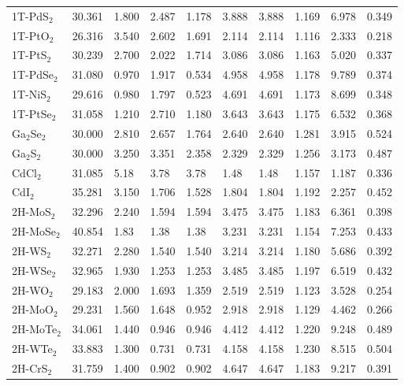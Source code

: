 \begin{center}
\begin{tabularx}{1.1\linewidth}{lXXXXXXXXX}
    1T-PdS$_{2}$ & 30.361  & 1.800  & 2.487  & 1.178  & 3.888  & 3.888  & 1.169  & 6.978  & 0.349 \\
    1T-PtO$_{2}$ & 26.316  & 3.540  & 2.602  & 1.691  & 2.114  & 2.114  & 1.116  & 2.333  & 0.218 \\
    1T-PtS$_{2}$ & 30.239  & 2.700  & 2.022  & 1.714  & 3.086  & 3.086  & 1.163  & 5.020  & 0.337 \\
    1T-PdSe$_{2}$ & 31.080  & 0.970  & 1.917  & 0.534  & 4.958  & 4.958  & 1.178  & 9.789  & 0.374 \\
    1T-NiS$_{2}$ & 29.616  & 0.980  & 1.797  & 0.523  & 4.691  & 4.691  & 1.173  & 8.699  & 0.348 \\
    1T-PtSe$_{2}$ & 31.058  & 1.210  & 2.710  & 1.180  & 3.643  & 3.643  & 1.175  & 6.532  & 0.368 \\
    Ga$_{2}$Se$_{2}$ & 30.000  & 2.810  & 2.657  & 1.764  & 2.640  & 2.640  & 1.281  & 3.915  & 0.524 \\
    Ga$_{2}$S$_{2}$ & 30.000  & 3.250  & 3.351  & 2.358  & 2.329  & 2.329  & 1.256  & 3.173  & 0.487 \\
    CdCl$_{2}$ & 31.085 & 5.18 & 3.78 & 3.78 & 1.48 & 1.48 & 1.157 & 1.187 & 0.336 \\
    CdI$_{2}$ & 35.281  & 3.150  & 1.706  & 1.528  & 1.804  & 1.804  & 1.192  & 2.257  & 0.452 \\
    2H-MoS$_{2}$ & 32.296  & 2.240  & 1.594  & 1.594  & 3.475  & 3.475  & 1.183  & 6.361  & 0.398 \\
    2H-MoSe$_{2}$ & 40.854 & 1.83 & 1.38 &   1.38 & 3.231 &  3.231 & 1.154 & 7.253 & 0.433 \\
    2H-WS$_{2}$ & 32.271  & 2.280  & 1.540  & 1.540  & 3.214  & 3.214  & 1.180  & 5.686  & 0.392 \\
    2H-WSe$_{2}$ & 32.965  & 1.930  & 1.253  & 1.253  & 3.485  & 3.485  & 1.197  & 6.519  & 0.432 \\
    2H-WO$_{2}$ & 29.183  & 2.000  & 1.693  & 1.359  & 2.519  & 2.519  & 1.123  & 3.528  & 0.254 \\
    2H-MoO$_{2}$ & 29.231  & 1.560  & 1.648  & 0.952  & 2.918  & 2.918  & 1.129  & 4.462  & 0.266 \\
    2H-MoTe$_{2}$ & 34.061  & 1.440  & 0.946  & 0.946  & 4.412  & 4.412  & 1.220  & 9.248  & 0.489 \\
    2H-WTe$_{2}$ & 33.883  & 1.300  & 0.731  & 0.731  & 4.158  & 4.158  & 1.230  & 8.515  & 0.504 \\
    2H-CrS$_{2}$ & 31.759  & 1.400  & 0.902  & 0.902  & 4.647  & 4.647  & 1.183  & 9.217  & 0.391 \\

\end{tabularx}
\end{center}
